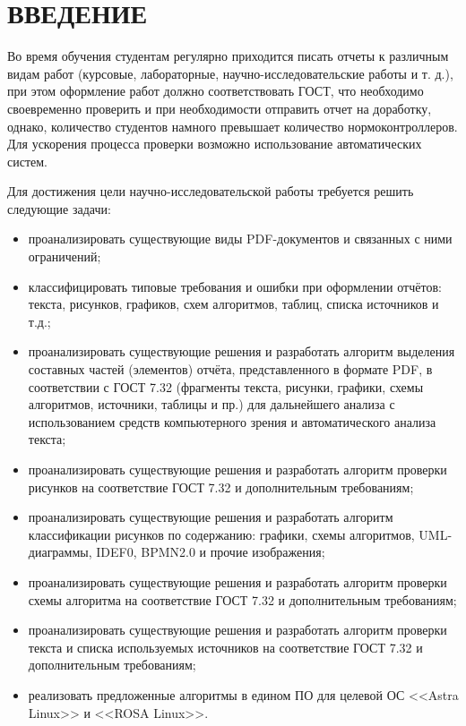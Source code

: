 \chapter*{ВВЕДЕНИЕ}

Во время обучения студентам регулярно приходится писать отчеты к различным видам работ (курсовые, лабораторные, научно-исследовательские работы и т. д.), при этом оформление работ должно соответствовать ГОСТ, что необходимо своевременно проверить и при необходимости отправить отчет на доработку, однако, количество студентов намного превышает количество нормоконтроллеров. Для ускорения процесса проверки возможно использование автоматических систем.

Для достижения цели научно-исследовательской работы требуется решить следующие задачи:
\begin{itemize}
	\item проанализировать существующие виды PDF-документов и связанных с ними ограничений;
	\item классифицировать типовые требования и ошибки при оформлении отчётов: текста, рисунков, графиков, схем алгоритмов, таблиц, списка источников и т.д.;
	\item проанализировать существующие решения и разработать алгоритм выделения составных частей (элементов) отчёта, представленного в формате PDF, в соответствии с ГОСТ 7.32 (фрагменты текста, рисунки, графики, схемы алгоритмов, источники, таблицы и пр.) для дальнейшего анализа с использованием средств компьютерного зрения и автоматического анализа текста;
	\item проанализировать существующие решения и разработать алгоритм проверки рисунков на соответствие ГОСТ 7.32 и дополнительным требованиям;
	\item проанализировать существующие решения и разработать алгоритм классификации рисунков по содержанию: графики, схемы алгоритмов, UML-диаграммы, IDEF0, BPMN2.0 и прочие изображения;
	\item проанализировать существующие решения и разработать алгоритм проверки схемы алгоритма на соответствие ГОСТ 7.32 и дополнительным требованиям;
	\item проанализировать существующие решения и разработать алгоритм проверки текста и списка используемых источников на соответствие ГОСТ 7.32 и дополнительным требованиям;
	\item реализовать предложенные алгоритмы в едином ПО для целевой ОС <<Astra Linux>> и <<ROSA Linux>>.
\end{itemize}
